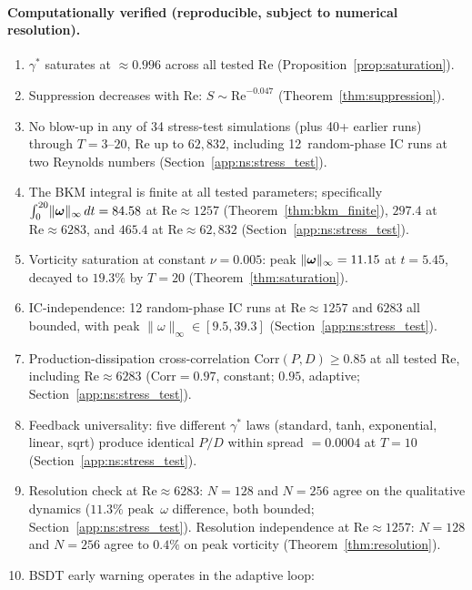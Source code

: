 \paragraph{Computationally verified (reproducible, subject to
  numerical resolution).}
\begin{enumerate}
\item $\gamma^*$ saturates at $\approx 0.996$ across all tested Re
  (Proposition~\ref{prop:saturation}).
\item Suppression decreases with Re: $S \sim
  \mathrm{Re}^{-0.047}$ (Theorem~\ref{thm:suppression}).
\item No blow-up in any of 34 stress-test simulations
  (plus 40+ earlier runs) through $T = 3$--$20$,
  $\mathrm{Re}$ up to $62{,}832$, including
  12~random-phase IC runs at two Reynolds numbers
  (Section~\ref{app:ns:stress_test}).
\item The BKM integral is finite at all tested parameters;
  specifically $\int_0^{20}\lVert \bm{\omega} \rVert_\infty\,dt = 84.58$
  at $\mathrm{Re}\approx 1257$ (Theorem~\ref{thm:bkm_finite}),
  $297.4$ at $\mathrm{Re} \approx 6283$,
  and $465.4$ at $\mathrm{Re} \approx 62{,}832$
  (Section~\ref{app:ns:stress_test}).
\item Vorticity saturation at constant $\nu = 0.005$: peak
  $\lVert \bm{\omega} \rVert_\infty = 11.15$ at $t = 5.45$,
  decayed to $19.3\%$ by $T = 20$
  (Theorem~\ref{thm:saturation}).
\item IC-independence: 12 random-phase IC runs at
  $\mathrm{Re} \approx 1257$ and $6283$ all
  bounded, with peak $\|\omega\|_\infty \in [9.5, 39.3]$
  (Section~\ref{app:ns:stress_test}).
\item Production-dissipation cross-correlation
  $\mathrm{Corr}(P,D) \ge 0.85$ at all tested Re,
  including $\mathrm{Re} \approx 6283$
  ($\mathrm{Corr} = 0.97$, constant;
  $0.95$, adaptive;
  Section~\ref{app:ns:stress_test}).
\item Feedback universality: five different $\gamma^*$ laws
  (standard, tanh, exponential, linear, sqrt) produce
  identical $P/D$ within spread $= 0.0004$ at $T=10$
  (Section~\ref{app:ns:stress_test}).
\item Resolution check at $\mathrm{Re}\approx 6283$:
  $N=128$ and $N=256$ agree on the qualitative
  dynamics ($11.3\%$ peak~$\omega$ difference,
  both bounded; Section~\ref{app:ns:stress_test}).
  Resolution independence at $\mathrm{Re}\approx 1257$:
  $N=128$ and $N=256$ agree to $0.4\%$ on peak
  vorticity (Theorem~\ref{thm:resolution}).
\item BSDT early warning operates in the adaptive loop:

\end{enumerate}
